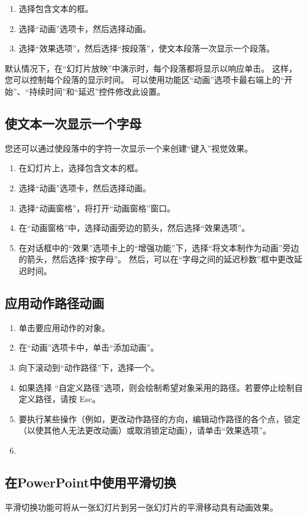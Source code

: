 \begin{enumerate}
    \item 选择包含文本的框。
    \item 选择“动画”选项卡，然后选择动画。
    \item 选择“效果选项”，然后选择“按段落”，使文本段落一次显示一个段落。
\end{enumerate}

默认情况下，在“幻灯片放映”中演示时，每个段落都将显示以响应单击。 这样，您可以控制每个段落的显示时间。 可以使用功能区“动画”选项卡最右端上的“开始”、“持续时间”和“延迟”控件修改此设置。

\subsection{使文本一次显示一个字母}

您还可以通过使段落中的字符一次显示一个来创建“键入”视觉效果。

\begin{enumerate}
    \item 在幻灯片上，选择包含文本的框。
    \item 选择“动画”选项卡，然后选择动画。
    \item 选择“动画窗格”，将打开“动画窗格”窗口。
    \item 在“动画窗格”中，选择动画旁边的箭头，然后选择“效果选项”。
    \item 在对话框中的“效果”选项卡上的“增强功能”下，选择“将文本制作为动画”旁边的箭头，然后选择“按字母”。 然后，可以在“字母之间的延迟秒数”框中更改延迟时间。
\end{enumerate}


\subsection{应用动作路径动画}

\begin{enumerate}
    \item 单击要应用动作的对象。
    \item 在“动画”选项卡中，单击“添加动画”。
    \item 向下滚动到“动作路径”下，选择一个。
    \item 如果选择 “自定义路径”选项，则会绘制希望对象采用的路径。若要停止绘制自定义路径，请按 Esc。
    \item 要执行某些操作（例如，更改动作路径的方向，编辑动作路径的各个点，锁定（以使其他人无法更改动画）或取消锁定动画），请单击“效果选项”。
    \item 
\end{enumerate}


\subsection{在PowerPoint中使用平滑切换}

平滑切换功能可将从一张幻灯片到另一张幻灯片的平滑移动具有动画效果。 